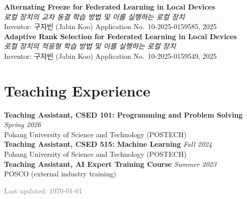 \documentclass[11pt,a4paper]{article}
\newcommand{\entry}[4]{%
  \textbf{#1} \hfill \textit{#2}\\
  #3 \hfill #4\\[2pt]
}
\begin{document}
\textbf{Alternating Freeze for Federated Learning in Local Devices}\\
\textit{로컬 장치의 교차 동결 학습 방법 및 이를 실행하는 로컬 장치}\\
Inventor: 구자빈 (Jabin Koo) \hfill Application No.\ 10-2025-0159585, 2025\\[4pt]

\textbf{Adaptive Rank Selection for Federated Learning in Local Devices}\\
\textit{로컬 장치의 적응형 학습 방법 및 이를 실행하는 로컬 장치}\\
Inventor: 구자빈 (Jabin Koo) \hfill Application No.\ 10-2025-0159549, 2025

\section*{Teaching Experience}

\entry{Teaching Assistant, CSED 101: Programming and Problem Solving}{Spring 2026}
{Pohang University of Science and Technology (POSTECH)}{}

\entry{Teaching Assistant, CSED 515: Machine Learning}{Fall 2024}
{Pohang University of Science and Technology (POSTECH)}{}

\entry{Teaching Assistant, AI Expert Training Course}{Summer 2023}
{POSCO (external industry training)}{}

\vfill
\begin{center}\small\textcolor{gray}{Last updated: \today}\end{center}
\end{document}

